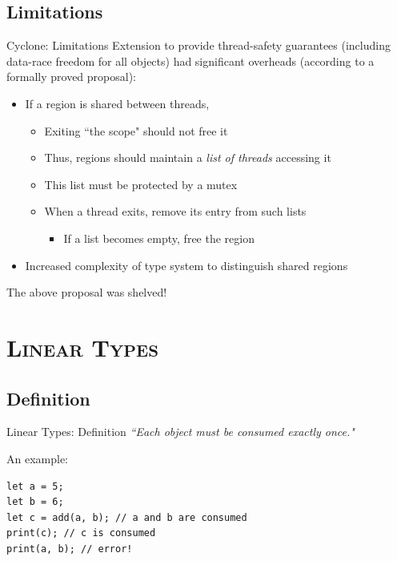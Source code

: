 \documentclass[xcolor=x11names,compress]{beamer}
\renewcommand{\(}{\begin{columns}}
\renewcommand{\)}{\end{columns}}
\newcommand{\<}[1]{\begin{column}{#1}}
\renewcommand{\>}{\end{column}}
\begin{document}
\subsection{Limitations}
\begin{frame}{Cyclone: Limitations}
    Extension to provide thread-safety guarantees (including data-race freedom for all objects) had significant overheads (according to a formally proved proposal):
    \pause
    \begin{itemize}
        \item If a region is shared between threads,
        \begin{itemize}
            \item Exiting ``the scope" should not free it
            \pause
            \item Thus, regions should maintain a \textit{list of threads} accessing it
            \pause
            \item This list must be protected by a mutex
            \pause
            \item When a thread exits, remove its entry from such lists
            \pause
            \begin{itemize}
                \item If a list becomes empty, free the region
            \end{itemize}
        \end{itemize}
        \pause
        \item Increased complexity of type system to distinguish shared regions
    \end{itemize}
    \pause
    The above proposal was shelved!
\end{frame}

\section{\scshape Linear Types}
\subsection{Definition}
\begin{frame}[fragile]{Linear Types: Definition}
\textit{``Each object must be consumed exactly once."}

\vspace{1.6em}

An example:
\begin{lstlisting}
let a = 5;
let b = 6;
let c = add(a, b); // a and b are consumed
print(c); // c is consumed
print(a, b); // error!
\end{lstlisting}
\end{frame}
\end{document}
